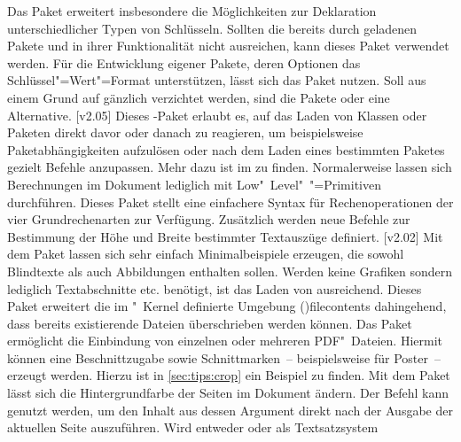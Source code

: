 \begin{DeclarePackages}
  Das Paket  erweitert insbesondere die Möglichkeiten zur 
  Deklaration unterschiedlicher Typen von Schlüsseln. Sollten die bereits durch 
  \TUDScript geladenen Pakete  und  in ihrer 
  Funktionalität nicht ausreichen, kann dieses Paket verwendet werden. Für die 
  Entwicklung eigener Pakete, deren Optionen das Schlüssel"=Wert"=Format 
  unterstützen, lässt sich das Paket  nutzen. Soll aus einem 
  Grund auf \KOMAScript gänzlich verzichtet werden, sind die Pakete   
   oder  eine Alternative.
[v2.05]
  Dieses \KOMAScript-Paket erlaubt es, auf das Laden von Klassen oder Paketen 
  direkt davor oder danach zu reagieren, um beispielsweise Paketabhängigkeiten 
  aufzulösen oder nach dem Laden eines bestimmten Paketes gezielt Befehle 
  anzupassen. Mehr dazu ist im \scrguide zu finden.
  Normalerweise lassen sich Berechnungen im Dokument lediglich mit 
  Low"~Level"~"=Primitiven durchführen. Dieses Paket stellt eine 
  einfachere Syntax für Rechenoperationen der vier Grundrechenarten zur 
  Verfügung. Zusätzlich werden neue Befehle zur Bestimmung der Höhe und Breite 
  bestimmter Textauszüge definiert.
[v2.02]
  Mit dem Paket  lassen sich sehr einfach Minimalbeispiele 
  erzeugen, die sowohl Blindtexte als auch Abbildungen enthalten sollen. Werden 
  keine Grafiken sondern lediglich Textabschnitte etc. benötigt, ist das Laden 
  von  ausreichend.
  Dieses Paket erweitert die im "~Kernel definierte Umgebung 
  \Environment(){filecontents} dahingehend, dass bereits 
  existierende Dateien überschrieben werden können.
  Das Paket ermöglicht die Einbindung von einzelnen oder mehreren PDF"~Dateien.
  Hiermit können eine Beschnittzugabe sowie Schnittmarken~-- beispielsweise für 
  Poster~-- erzeugt werden. Hierzu ist in \autoref{sec:tips:crop} ein Beispiel 
  zu finden.
  Mit dem Paket lässt sich die Hintergrundfarbe der Seiten im Dokument ändern.
  Der Befehl  kann genutzt werden, um den 
  Inhalt aus dessen Argument direkt nach der Ausgabe der aktuellen Seite 
  auszuführen.
  Wird entweder  oder  als Textsatzsystem 

\end{DeclarePackages}
